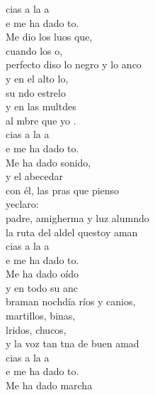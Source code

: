 \documentclass[12pt]{article}
\begin{document}
\begin{multicols*}{2}
\begin{cancion}%
	cias a la a \\
	e me ha dado to.\\
	Me dio los luos que, \\
	cuando los o,\\
	perfecto diso lo negro y lo anco\\
	y en el alto lo, \\
	su ndo estrelo\\
	y en las multdes\\
	al mbre que yo .\\
\jump
	cias a la a \\
	e me ha dado to.\\
	Me ha dado sonido, \\
	y el abecedar\\
	con él, las pras que pienso \\
	yeclaro:\\
	padre, amigherma y luz alumndo\\
	la ruta del aldel questoy aman\\
\jump
	cias a la a \\
	e me ha dado to.\\
	Me ha dado oído\\
	y en todo su anc\\
	braman nochdía ríos y canios,\\
	martillos, binas, \\
	lridos, chucos,\\
	y la voz tan tna de  buen amad\\
\jump
	cias a la a \\
	e me ha dado to.\\
	Me ha dado marcha \\

\end{cancion}
\end{multicols*}
\end{document}
